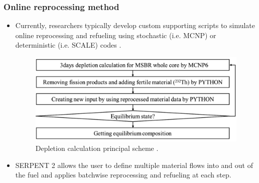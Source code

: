 \begin{frame}
\frametitle{Online reprocessing method}
	\begin{itemize}
		\item Currently, researchers typically develop custom supporting scripts to simulate online reprocessing and refueling using stochastic (i.e. MCNP) or deterministic (i.e. SCALE) codes \cite{jeong_equilibrium_2016, powers_new_2013}.
		    \begin{figure}[t]
                \vspace*{-0.05in}
                 \includegraphics[height=0.30\textwidth]{./images/python_script.png}
                \vspace*{-0.05in}
                \caption{Depletion calculation principal scheme  \cite{park_whole_2015}.}
      \end{figure}
		\item SERPENT 2 allows the user to define multiple material flows into and out of the fuel and applies 								batchwise reprocessing and refueling at each step.
	\end{itemize}
\end{frame}

